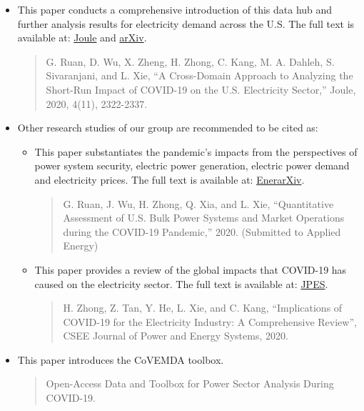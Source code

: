 \documentclass[10pt]{article}
\newcommand{\covemda}{CoVEMDA}
\numberwithin{equation}{section}
\numberwithin{table}{section}
\numberwithin{figure}{section}
\begin{document}
\begin{itemize}
\item This paper conducts a comprehensive introduction of this data hub and further analysis results for electricity demand across the U.S. The full text is available at: 
\href{https://www.cell.com/joule/pdfExtended/S2542-4351(20)30398-6}{Joule}
and \href{https://arxiv.org/abs/2005.06631}{arXiv}.
\begin{quotation}\footnotesize
G. Ruan, D. Wu, X. Zheng, H. Zhong, C. Kang, M. A. Dahleh, S. Sivaranjani, and L. Xie, ``A Cross-Domain Approach to Analyzing the Short-Run Impact of COVID-19 on the U.S. Electricity Sector,'' Joule, 2020, 4(11), 2322-2337.
\end{quotation}

\item Other research studies of our group are recommended to be cited as:
\begin{itemize}

\item This paper substantiates the pandemic's impacts from the perspectives of power system security, electric power generation, electric power demand and electricity prices. The full text is available at: \href{http://www.enerarxiv.org/page/thesis.html?id=2196}{EnerarXiv}.
\begin{quotation}\footnotesize
G. Ruan, J. Wu, H. Zhong, Q. Xia, and L. Xie, ``Quantitative Assessment of U.S. Bulk Power Systems and Market Operations during the COVID-19 Pandemic,'' 2020. (Submitted to Applied Energy)
\end{quotation}

\item This paper provides a review of the global impacts that COVID-19 has caused on the electricity sector. The full text is available at: \href{https://ieeexplore.ieee.org/abstract/document/9160443}{JPES}.

\begin{quotation}\footnotesize
H. Zhong, Z. Tan, Y. He, L. Xie, and C. Kang, ``Implications of COVID-19 for the Electricity Industry: A Comprehensive Review'', CSEE Journal of Power and Energy Systems, 2020.
\end{quotation}

\end{itemize}

\item This paper introduces the \covemda{} toolbox.
\begin{quotation}
Open-Access Data and Toolbox for Power Sector Analysis During COVID-19.
\end{quotation}



\end{itemize}
\end{document}
